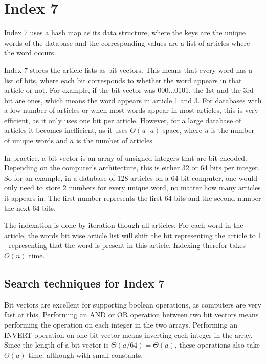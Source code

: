 \section{Index 7}
Index 7 uses a hash map as its data structure, where the keys are the unique words of the database and the corresponding values are a list of articles where the word occurs. 

Index 7 stores the article lists as bit vectors. This means that every word has a list of bits, where each bit corresponds to whether the word appears in that article or not. For example, if the bit vector was 000...0101, the 1st and the 3rd bit are ones, which means the word appears in article 1 and 3. For databases with a low number of articles or when most words appear in most articles, this is very efficient, as it only uses one bit per article. However, for a large database of articles it becomes inefficient, as it uses $\Theta(u\cdot a)$ space, where $u$ is the number of unique words and $a$ is the number of articles. 

In practice, a bit vector is an array of unsigned integers that are bit-encoded. Depending on the computer's architecture, this is either 32 or 64 bits per integer. So for an example, in a database of 128 articles on a 64-bit computer, one would only need to store 2 numbers for every unique word, no matter how many articles it appears in. The first number represents the first 64 bits and the second number the next 64 bits. 

The indexation is done by iteration though all articles. For each word in the article, the words bit wise article list will shift the bit representing the article to 1 - representing that the word is present in this article. Indexing therefor takes $O(n)$ time.

\subsection{Search techniques for Index 7}
Bit vectors are excellent for supporting boolean operations, as computers are very fast at this. Performing an AND or OR operation between two bit vectors means performing the operation on each integer in the two arrays. Performing an INVERT operation on one bit vector means inverting each integer in the array. Since the length of a bit vector is $\Theta(a/64) = \Theta(a)$, these operations also take $\Theta(a)$ time, although with small constants. 

